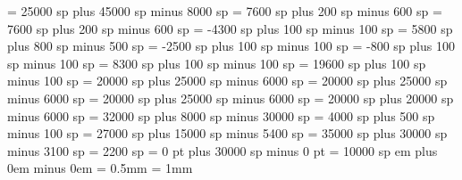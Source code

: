 \gre@interwordspacetext = 25000 sp plus 45000 sp minus 8000 sp
\gre@bitrivirspace = 7600 sp plus 200 sp minus 600 sp
\gre@bitristrospace = 7600 sp plus 200 sp minus 600 sp
\gre@punctuminclinatumshift= -4300 sp plus 100 sp minus 100 sp
\gre@beforepunctainclinatashift= 5800 sp plus 800 sp minus 500 sp
\gre@punctuminclinatumanddebilisshift= -2500 sp plus 100 sp minus 100 sp
\gre@punctuminclinatumdebilisshift= -800 sp plus 100 sp minus 100 sp
\gre@punctuminclinatumbigshift= 8300 sp plus 100 sp minus 100 sp
\gre@punctuminclinatummaxshift= 19600 sp plus 100 sp minus 100 sp
\gre@spacearoundsmallbar = 20000 sp plus 25000 sp minus 6000 sp
\gre@spacearoundminor = 20000 sp plus 25000 sp minus 6000 sp
\gre@spacearoundmaior = 20000 sp plus 25000 sp minus 6000 sp
\gre@spacearoundfinalis = 20000 sp plus 20000 sp minus 6000 sp
\gre@spacebeforefinalfinalis= 32000 sp plus 8000 sp minus 30000 sp
\gre@spacearoundclefbars= 4000 sp plus 500 sp minus 100 sp
\gre@textbartextspace = 27000 sp plus 15000 sp minus 5400 sp
\gre@notebarspace = 35000 sp plus 30000 sp minus 3100 sp
\gre@maximumspacewithoutdash = 2200 sp
\gre@afterclefnospace = 0 pt plus 30000 sp minus 0 pt
\gre@additionalcustoslineswidth = 10000 sp
 em plus 0em minus 0em
\gre@minimalspaceatlinebeginning=1mm
\gre@manualinitialwidth=0pt
\gre@aboveinitialseparation = 0.5mm
\gre@noclefspace = 1mm

